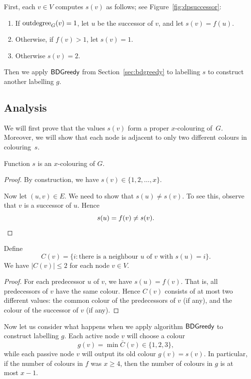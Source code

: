 First, each $v \in V$ computes $s(v)$ as follows; see Figure~\ref{fig:dpsuccessor}:
\begin{enumerate}
    \item If $\operatorname{outdegree}_G(v) = 1$, let $u$ be the successor of $v$, and let $s(v) = f(u)$.
    \item Otherwise, if $f(v) > 1$, let $s(v) = 1$.
    \item Otherwise $s(v) = 2$.
\end{enumerate}
Then we apply $\textsf{BDGreedy}$ from Section~\ref{sec:bdgreedy} to labelling $s$ to construct another labelling $g$.


\subsection{Analysis}

We will first prove that the values $s(v)$ form a proper $x$-colouring of~$G$. Moreover, we will show that each node is adjacent to only two different colours in colouring~$s$.

\begin{lemma}
    Function $s$ is an $x$-colouring of $G$.
\end{lemma}
\begin{proof}
    By construction, we have $s(v) \in \{1,2,\dotsc,x\}$.
    
    Now let $(u,v) \in E$. We need to show that $s(u) \ne s(v)$. To see this, observe that $v$ is a successor of $u$. Hence
    \[
        s(u) = f(v) \ne s(v). \qedhere
    \]
\end{proof}

\begin{lemma}
    Define
    \[
        C(v) = \{ i : \text{there is a neighbour $u$ of $v$ with $s(u) = i$} \}.
    \]
    We have $|C(v)| \le 2$ for each node $v \in V$.
\end{lemma}
\begin{proof}
    For each predecessor $u$ of $v$, we have $s(u) = f(v)$. That is, all predecessors of $v$ have the same colour. Hence $C(v)$ consists of at most two different values: the common colour of the predecessors of $v$ (if any), and the colour of the successor of $v$ (if any).
\end{proof}

Now let us consider what happens when we apply algorithm $\textsf{BDGreedy}$ to construct labelling $g$. Each active node $v$ will choose a colour \[g(v) = \min \bar{C}(v) \in \{1,2,3\},\] while each passive node $v$ will output its old colour $g(v) = s(v)$. In particular, if the number of colours in $f$ was $x \ge 4$, then the number of colours in $g$ is at most $x - 1$.

